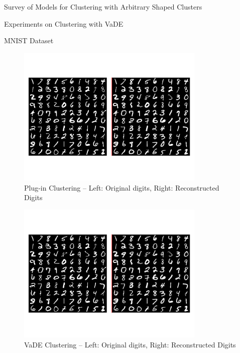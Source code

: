 \documentclass{article}
\begin{document}
\begin{psection}{Survey of Models for Clustering with Arbitrary Shaped Clusters}
\begin{psubsection}{Experiments on Clustering with VaDE}
\begin{pssubsection}{MNIST Dataset}
			\begin{figure}[h!]
				\centering
				\includegraphics[width=0.8\textwidth, trim={0.5 2.1cm 0.5 2.1cm}, clip]{includes/plots/mnist/recon-initial.png}
				\caption{Plug-in Clustering -- Left: Original digits, Right: Reconstructed Digits}
				\label{fig:gmm-recon}
			\end{figure}

			\begin{figure}[h!]
				\centering
				\includegraphics[width=0.8\textwidth, trim={0.5 2.1cm 0.5 2.1cm}, clip]{includes/plots/mnist/recon-final.png}
				\caption{VaDE Clustering -- Left: Original digits, Right: Reconstructed Digits}
				\label{fig:vade-recon}
			\end{figure}


\end{pssubsection}
\end{psubsection}
\end{psection}
\end{document}
